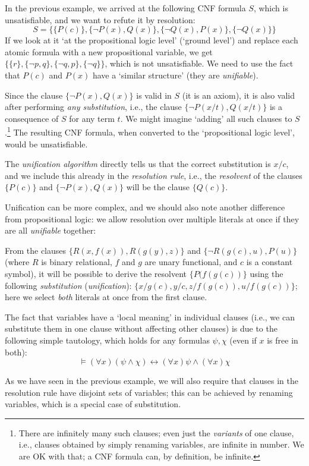 \begin{example}
    In the previous example, we arrived at the following CNF formula $S$, which is unsatisfiable, and we want to refute it by resolution:    
    $$
    S = \{\{P(c)\},\{\neg P(x),Q(x)\},\{\neg Q(x),P(x)\},\{\neg Q(x)\}\}
    $$
    If we look at it `at the propositional logic level' (`ground level') and replace each atomic formula with a new propositional variable, we get $\{\{r\},\{\neg p,q\},\{\neg q,p\},\{\neg q\}\}$, which is not unsatisfiable. We need to use the fact that $P(c)$ and $P(x)$ have a `similar structure' (they are \emph{unifiable}).

    Since the clause $\{\neg P(x),Q(x)\}$ is valid in $S$ (it is an axiom), it is also valid after performing \emph{any substitution}, i.e., the clause $\{\neg P(x/t),Q(x/t)\}$ is a consequence of $S$ for any term $t$. We might imagine `adding' all such clauses to $S$.\footnote{There are infinitely many such clauses; even just the \emph{variants} of one clause, i.e., clauses obtained by simply renaming variables, are infinite in number. We are OK with that; a CNF formula can, by definition, be infinite.} The resulting CNF formula, when converted to the `propositional logic level', would be unsatisfiable.

    The \emph{unification algorithm} directly tells us that the correct substitution is $x/c$, and we include this already in the \emph{resolution rule}, i.e., the \emph{resolvent} of the clauses $\{P(c)\}$ and $\{\neg P(x),Q(x)\}$ will be the clause $\{Q(c)\}$.
\end{example}

Unification can be more complex, and we should also note another difference from propositional logic: we allow resolution over multiple literals at once if they are all \emph{unifiable} together:

\begin{example}
    From the clauses $\{R(x,f(x)),R(g(y),z)\}$ and $\{\neg R(g(c),u),P(u)\}$ (where $R$ is binary relational, $f$ and $g$ are unary functional, and $c$ is a constant symbol), it will be possible to derive the resolvent $\{P(f(g(c))\}$ using the following \emph{substitution} (\emph{unification}): $\{x/g(c),y/c,z/f(g(c)),u/f(g(c))\}$; here we select \emph{both} literals at once from the first clause.
\end{example}

\begin{remark}
    The fact that variables have a `local meaning' in individual clauses (i.e., we can substitute them in one clause without affecting other clauses) is due to the following simple tautology, which holds for any formulas $\psi,\chi$ (even if $x$ is free in both):
    $$
    \models(\forall x)(\psi \land \chi) \leftrightarrow (\forall x)\psi \land (\forall x)\chi
    $$
    
    As we have seen in the previous example, we will also require that clauses in the resolution rule have disjoint sets of variables; this can be achieved by renaming variables, which is a special case of substitution.
\end{remark}

